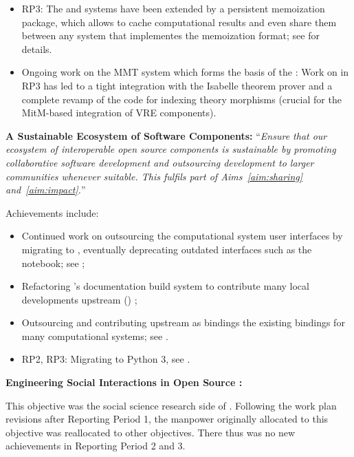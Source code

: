 \begin{compactenum}[\bf {Obj} 1\rm]
\begin{itemize}
  \item RP3: The \SageMath and \GAP systems have been extended by a persistent memoization package, which allows to cache computational results and even share them between any system that implementes the memoization format; see  for details.
  \item Ongoing work on the MMT system which forms the basis of the
    : Work on  in RP3 has led to a tight integration with the Isabelle theorem prover and a complete revamp of the code for indexing theory morphisms (crucial for the MitM-based integration of VRE components).
  \end{itemize}

\item \label{objective:sustainable}
  \textbf{A Sustainable Ecosystem of Software Components:}
  ``\emph{Ensure that our ecosystem of
  interoperable open source components is \emph{sustainable} by
  promoting collaborative software development and outsourcing
  development to larger communities whenever suitable. This fulfils
  part of Aims~\ref{aim:sharing} and~\ref{aim:impact}.}''

  Achievements include:
  \begin{itemize}
  \item Continued work on outsourcing the computational system user interfaces by migrating to \Jupyter, eventually deprecating outdated interfaces such as the \Sage notebook; see ;
  \item Refactoring \Sage's documentation build system to contribute many local developments
    upstream (\Sphinx) ;
  \item Outsourcing and contributing upstream as \Python bindings the existing \Sage
    bindings for many computational systems; see .
  \item RP2, RP3: Migrating \Sage to Python 3, see .
  \end{itemize}

\begingroup
\color{gray}
\item \label{objective:social}
  \textbf{Engineering Social Interactions in Open Source \VRE:}

  This objective was the social science research side of
  . Following the work plan revisions after
  Reporting Period 1, the manpower originally allocated to this
  objective was reallocated to other objectives. There thus was no new
  achievements in Reporting Period 2 and 3.


\end{compactenum}
